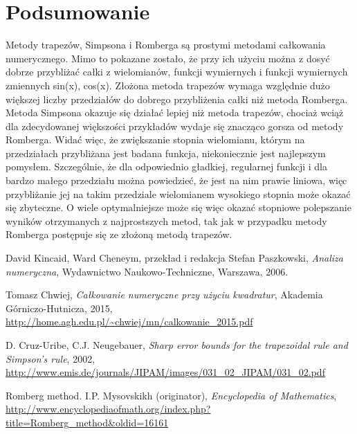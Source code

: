 \documentclass[11pt,wide]{article}
\begin{document}
\section{Podsumowanie}
Metody trapezów, Simpsona i Romberga są prostymi metodami całkowania numerycznego. Mimo to pokazane zostało, że przy ich użyciu można z dosyć dobrze przybliżać całki z wielomianów, funkcji wymiernych i funkcji wymiernych zmiennych sin(x), cos(x). Złożona metoda trapezów wymaga względnie dużo większej liczby przedziałów do dobrego przybliżenia całki niż metoda Romberga. Metoda Simpsona okazuje się działać lepiej niż metoda trapezów, chociaż wciąż dla zdecydowanej większości przykładów wydaje się znacząco gorsza od metody Romberga. Widać więc, że zwiększanie stopnia wielomianu, którym na przedziałach przybliżana jest badana funkcja, niekoniecznie jest najlepszym pomysłem. Szczególnie, że dla odpowiednio gładkiej, regularnej funkcji i dla bardzo małego przedziału można powiedzieć, że jest na nim prawie liniowa, więc przybliżanie jej na takim przedziale wielomianem wysokiego stopnia może okazać się zbyteczne. O wiele optymalniejsze może się więc okazać stopniowe polepszanie wyników otrzymanych z najprostszych metod, tak jak w przypadku metody Romberga postępuje się ze złożoną metodą trapezów.

\begin{thebibliography}{10}
 David Kincaid, Ward Cheneym, przekład i redakcja Stefan Paszkowski,
\emph{Analiza numeryczna},
Wydawnictwo Naukowo-Techniczne, Warszawa, 2006.

 Tomasz Chwiej,
\emph{Całkowanie numeryczne przy użyciu kwadratur},
Akademia Górniczo-Hutnicza, 2015, \url{http://home.agh.edu.pl/~chwiej/mn/calkowanie_2015.pdf}

 D. Cruz-Uribe, C.J. Neugebauer,
\emph{Sharp error bounds for the trapezoidal rule and Simpson's rule},
2002, \url{http://www.emis.de/journals/JIPAM/images/031_02_JIPAM/031_02.pdf}

 Romberg method. I.P. Mysovskikh (originator),
\emph{Encyclopedia of Mathematics},
\url{http://www.encyclopediaofmath.org/index.php?title=Romberg_method&oldid=16161}

\end{thebibliography}
\end{document}
